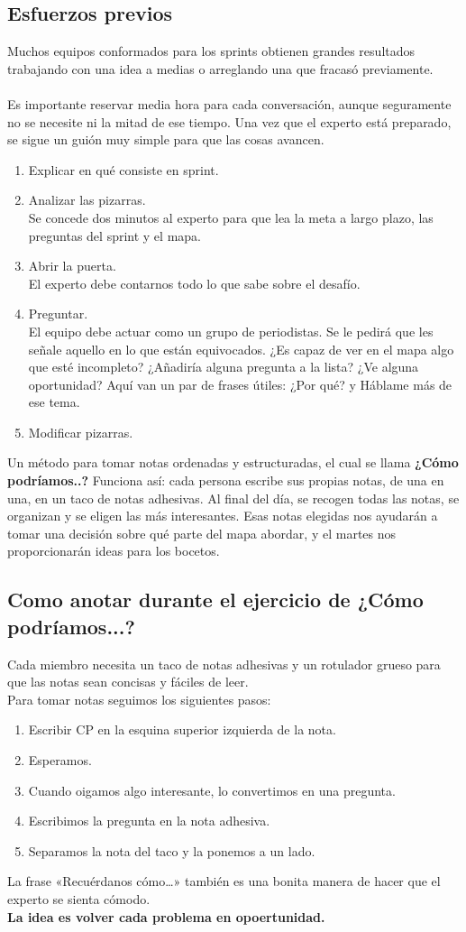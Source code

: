 \documentclass[10pt]{article}
\begin{document}
\begin{multicols}{2}
\subsection*{Esfuerzos previos}
Muchos equipos conformados
para los sprints obtienen grandes resultados trabajando con una idea a medias o arreglando una que fracasó previamente.\\\\
Es importante reservar media hora para cada conversación, aunque seguramente no se necesite ni la mitad de ese tiempo. Una vez que el experto está preparado, se sigue un guión muy simple para que las cosas avancen.
\begin{enumerate}[\bfseries 1)]
\item Explicar en qué consiste en sprint.
\item Analizar las pizarras.\\
Se concede dos minutos al experto para que lea la meta a largo plazo, las preguntas del sprint y el mapa.
\item Abrir la puerta.\\
El experto debe contarnos todo lo que sabe sobre el desafío.
\item Preguntar.\\
El equipo debe actuar como un grupo de periodistas. Se  le pedirá que les señale aquello en lo que están equivocados. ¿Es capaz de ver en el mapa algo que esté incompleto? ¿Añadiría alguna pregunta a la lista? ¿Ve alguna oportunidad? Aquí van un par de frases útiles: ¿Por qué? y Háblame más de ese tema.
\item Modificar pizarras.
\end{enumerate}
Un método para tomar notas ordenadas y estructuradas, el cual se llama \textbf{¿Cómo podríamos..?} Funciona así: cada persona escribe sus propias notas, de una en una, en un taco de notas adhesivas. Al final del día, se recogen todas las notas, se organizan y se eligen las más interesantes. Esas notas elegidas nos ayudarán a tomar una decisión sobre qué parte del mapa abordar, y el martes nos proporcionarán ideas para los bocetos.
\subsection*{Como anotar durante el ejercicio de ¿Cómo podríamos...?}
Cada miembro necesita un taco de notas adhesivas y un rotulador grueso para que las notas sean concisas y fáciles de leer.\\
Para tomar notas seguimos los siguientes pasos:
\begin{enumerate}
\item Escribir CP en la esquina superior izquierda de la nota.
\item Esperamos.
\item Cuando oigamos algo interesante, lo convertimos en una pregunta.
\item Escribimos la pregunta en la nota adhesiva.
\item Separamos la nota del taco y la ponemos a un lado.
\end{enumerate}
La frase «Recuérdanos cómo…» también es una bonita manera de hacer que el experto se sienta cómodo.\\
\textbf{La idea es volver cada problema en opoertunidad.}

\end{multicols}
\end{document}
